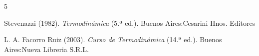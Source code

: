 \documentclass[../main]{subfiles}
\begin{document}
\begin{thebibliography}{5}

  Stevenazzi (1982).
  \textit{Termodinámica} (5.ª ed.). Buenos Aires:Cesarini Hnos. Editores

  L. A. Facorro Ruiz (2003).
  \textit{Curso de Termodinámica} (14.ª ed.). Buenos Aires:Nueva Libreria S.R.L.

\end{thebibliography}
\end{document}
